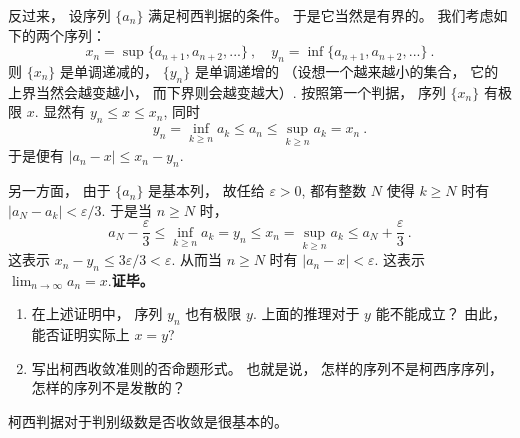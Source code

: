 反过来， 设序列 $\{a_n\}$ 满足柯西判据的条件。 于是它当然是有界的。 我们考虑如下的两个序列：
$$
x_n=\sup\{a_{n+1},a_{n+2},...\}~,
\quad
y_n=\inf\{a_{n+1},a_{n+2},...\}~.
$$
则 $\{x_n\}$ 是单调递减的， $\{y_n\}$ 是单调递增的 （设想一个越来越小的集合， 它的上界当然会越变越小， 而下界则会越变越大）. 按照第一个判据， 序列 $\{x_n\}$ 有极限 $x$. 显然有 $y_n\leq x\leq x_n$, 同时
$$
y_n=\inf_{k\geq n}a_k\leq a_n\leq \sup_{k\geq n}a_k=x_n~.
$$
于是便有 $|a_n-x|\leq x_n-y_n$. 

另一方面， 由于 $\{a_n\}$ 是基本列， 故任给 $\varepsilon>0$, 都有整数 $N$ 使得 $k\geq N$ 时有 $|a_N-a_k|<\varepsilon/3$. 于是当 $n\geq N$ 时，
$$
a_N-\frac{\varepsilon}{3}\leq \inf_{k\geq n}a_k=y_n
\leq x_n=\sup_{k\geq n}a_k\leq a_N+\frac{\varepsilon}{3}~.
$$
这表示 $x_n-y_n\leq 3\varepsilon/3<\varepsilon$. 从而当 $n\geq N$ 时有 $|a_n-x|<\varepsilon$. 这表示 $\lim_{n\to\infty}a_n=x$.\textbf{证毕。}

\begin{exercise}{}
\begin{enumerate}
\item 在上述证明中， 序列 $y_n$ 也有极限 $y$. 上面的推理对于 $y$ 能不能成立？ 由此， 能否证明实际上 $x=y$?
\item 写出柯西收敛准则的否命题形式。 也就是说， 怎样的序列不是柯西序序列， 怎样的序列不是发散的？
\end{enumerate}
\end{exercise}

柯西判据对于判别级数是否收敛是很基本的。
